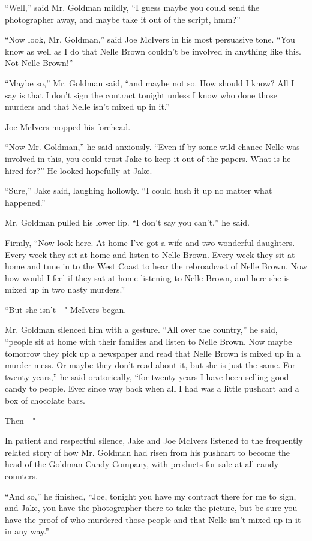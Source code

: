 \documentclass{novel}
\begin{document}
“Well,” said Mr. Goldman mildly, “I guess maybe you could send the photographer away, and maybe take it out of the script, hmm?”

“Now look, Mr. Goldman,” said Joe McIvers in his most persuasive tone. “You know as well as I do that Nelle Brown couldn’t be involved in anything like this. Not Nelle Brown!”

“Maybe so,” Mr. Goldman said, “and maybe not so. How should I know? All I say is that I don’t sign the contract tonight unless I know who done those murders and that Nelle isn’t mixed up in it.”

Joe McIvers mopped his forehead.

“Now Mr. Goldman,” he said anxiously. “Even if by some wild chance Nelle was involved in this, you could trust Jake to keep it out of the papers. What is he hired for?” He looked hopefully at Jake.

“Sure,” Jake said, laughing hollowly. “I could hush it up no matter what happened.”

Mr. Goldman pulled his lower lip. “I don’t say you can’t,” he said.

Firmly, “Now look here. At home I've got a wife and two wonderful daughters. Every week they sit at home and listen to Nelle Brown. Every week they sit at home and tune in to the West Coast to hear the rebroadcast of Nelle Brown. Now how would I feel if they sat at home listening to Nelle Brown, and here she is mixed up in two nasty murders.”

“But she isn’t—" McIvers began.

Mr. Goldman silenced him with a gesture. “All over the country,” he said, “people sit at home with their families and listen to Nelle Brown. Now maybe tomorrow they pick up a newspaper and read that Nelle Brown is mixed up in a murder mess. Or maybe they don’t read about it, but she is just the same. For twenty years,” he said oratorically, “for twenty years I have been selling good candy to people. Ever since way back when all I had was a little pushcart and a box of chocolate bars.

Then—"

In patient and respectful silence, Jake and Joe McIvers listened to the frequently related story of how Mr. Goldman had risen from his pushcart to become the head of the Goldman Candy Company, with products for sale at all candy counters.

“And so,” he finished, “Joe, tonight you have my contract there for me to sign, and Jake, you have the photographer there to take the picture, but be sure you have the proof of who murdered those people and that Nelle isn’t mixed up in it in any way.”
\end{document}
